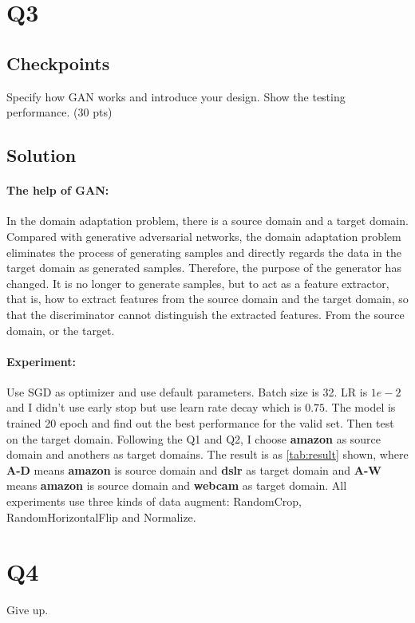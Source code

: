 \documentclass[10pt,twocolumn,letterpaper]{article}
\begin{document}
\section{Q3}

\subsection{Checkpoints}
Specify how GAN works and introduce your design. Show the testing performance. (30 pts)
\subsection{Solution}
\paragraph{The help of GAN:}
In the domain adaptation problem, there is a source domain and a target domain. Compared with generative adversarial networks, the domain adaptation problem eliminates the process of generating samples and directly regards the data in the target domain as generated samples. Therefore, the purpose of the generator has changed. It is no longer to generate samples, but to act as a feature extractor, that is, how to extract features from the source domain and the target domain, so that the discriminator cannot distinguish the extracted features. From the source domain, or the target\cite{ganin2015unsupervised}.
\paragraph{Experiment:}
Use SGD as optimizer and use default parameters. Batch size is 32. LR is $1e-2$ and I didn't use early stop but use learn rate decay which is $0.75$.
The model is trained 20 epoch and find out the best performance for the valid set. Then test on the target domain. Following the Q1 and Q2, I choose \textbf{amazon} as source domain and anothers as target domains. The result is as \cref{tab:result} shown, where \textbf{A-D} means \textbf{amazon} is source domain and \textbf{dslr} as target domain and \textbf{A-W} means \textbf{amazon} is source domain and \textbf{webcam} as target domain. 
All experiments use three kinds of data augment: RandomCrop, RandomHorizontalFlip and Normalize.
\section{Q4}
Give up.


{\small


}
\end{document}
